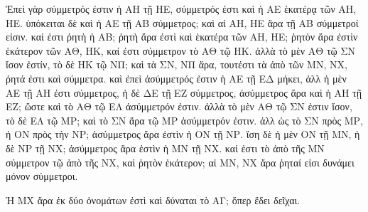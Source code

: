 \begin{Parallel}{}{}
{{\greekfont Ἐπεὶ γὰρ σύμμετρός ἐστιν ἡ ΑΗ τῇ ΗΕ, σύμμετρός ἐστι
καὶ ἡ ΑΕ ἑκατέρᾳ τῶν ΑΗ, ΗΕ. ὑπόκειται δὲ καὶ ἡ ΑΕ  τῇ ΑΒ σύμμετρος; καὶ αἱ
ΑΗ, ΗΕ ἄρα τῇ ΑΒ σύμμετροί εἰσιν. καί ἐστι ῥητὴ ἡ ΑΒ; ῥητὴ
ἄρα ἐστὶ καὶ ἑκατέρα τῶν ΑΗ, ΗΕ; ῥητὸν ἄρα ἐστὶν ἑκάτερον
τῶν ΑΘ, ΗΚ, καί ἐστι σύμμετρον τὸ ΑΘ τῷ ΗΚ. ἀλλὰ τὸ μὲν ΑΘ
τῷ ΣΝ ἴσον ἐστίν, τὸ δὲ ΗΚ τῷ ΝΠ; καὶ
τὰ ΣΝ, ΝΠ ἄρα,
τουτέστι τὰ ἀπὸ τῶν ΜΝ, ΝΧ, ῥητά ἐστι καὶ σύμμετρα. καὶ
ἐπεὶ ἀσύμμετρός ἐστιν ἡ ΑΕ τῇ ΕΔ μήκει, ἀλλ
ἡ μὲν ΑΕ τῇ ΑΗ ἐστι σύμμετρος, ἡ δὲ ΔΕ τῇ ΕΖ σύμμετρος,
ἀσύμμετρος ἄρα καὶ ἡ ΑΗ τῇ ΕΖ;
ὥστε καὶ τὸ ΑΘ τῷ ΕΛ ἀσύμμετρόν ἐστιν. ἀλλὰ τὸ μὲν
ΑΘ τῷ ΣΝ ἐστιν ἴσον, τὸ δὲ ΕΛ τῷ ΜΡ; καὶ τὸ ΣΝ ἄρα
τῷ ΜΡ ἀσύμμετρόν ἐστιν. ἀλλ ὡς τὸ ΣΝ πρὸς ΜΡ, ἡ ΟΝ
πρὸς τὴν ΝΡ; ἀσύμμετρος ἄρα ἐστὶν ἡ ΟΝ τῇ ΝΡ.
ἴση δὲ ἡ μὲν ΟΝ τῇ ΜΝ, ἡ δὲ ΝΡ
τῇ ΝΧ; ἀσύμμετρος ἄρα ἐστὶν ἡ ΜΝ τῇ ΝΧ. καί
ἐστι τὸ ἀπὸ τῆς ΜΝ σύμμετρον τῷ ἀπὸ τῆς ΝΧ, καὶ
ῥητὸν ἑκάτερον; αἱ ΜΝ, ΝΧ ἄρα ῥηταί εἰσι
δυνάμει μόνον σύμμετροι.}

{\greekfont Ἡ ΜΧ ἄρα ἐκ δύο ὀνομάτων ἐστὶ καὶ δύναται
τὸ ΑΓ; ὅπερ ἔδει δεῖχαι.}}

\end{Parallel}
